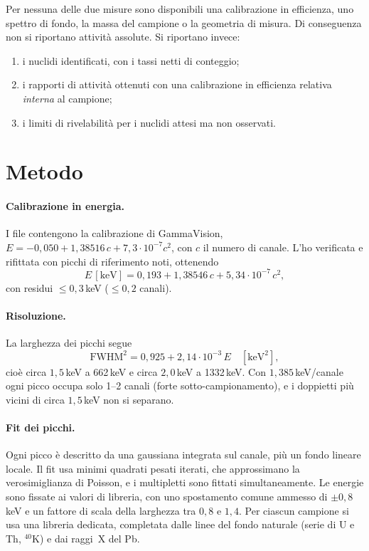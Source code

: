 \documentclass[11pt,a4paper]{article}
\newcommand{\nuc}[2]{\ensuremath{{}^{#1}\mathrm{#2}}}
\newcommand{\ee}[1]{\cdot 10^{#1}}
\begin{document}
Per nessuna delle due misure sono disponibili una calibrazione in efficienza, uno spettro di fondo, la massa del campione o la geometria di misura. Di conseguenza non si riportano attività assolute. Si riportano invece:
\begin{enumerate}[label=(\roman*)]
\item i nuclidi identificati, con i tassi netti di conteggio;
\item i rapporti di attività ottenuti con una calibrazione in efficienza relativa \emph{interna} al campione;
\item i limiti di rivelabilità per i nuclidi attesi ma non osservati.
\end{enumerate}

\section{Metodo}

\paragraph{Calibrazione in energia.}
I file contengono la calibrazione di GammaVision, $E=-0{,}050+1{,}38516\,c+7{,}3\ee{-7}c^2$, con $c$ il numero di canale. L'ho verificata e rifittata con picchi di riferimento noti, ottenendo
\[
E\,[\mathrm{keV}] = 0{,}193 + 1{,}38546\,c + 5{,}34\ee{-7}\,c^2,
\]
con residui $\le0{,}3$\,keV ($\le0{,}2$ canali).

\paragraph{Risoluzione.}
La larghezza dei picchi segue
\[
\mathrm{FWHM}^2 = 0{,}925 + 2{,}14\ee{-3}\,E \quad [\mathrm{keV}^2],
\]
cioè circa $1{,}5$\,keV a 662\,keV e circa $2{,}0$\,keV a 1332\,keV. Con $1{,}385$\,keV/canale ogni picco occupa solo 1--2 canali (forte sotto-campionamento), e i doppietti più vicini di circa $1{,}5$\,keV non si separano.

\paragraph{Fit dei picchi.}
Ogni picco è descritto da una gaussiana integrata sul canale, più un fondo lineare locale. Il fit usa minimi quadrati pesati iterati, che approssimano la verosimiglianza di Poisson, e i multipletti sono fittati simultaneamente. Le energie sono fissate ai valori di libreria, con uno spostamento comune ammesso di $\pm0{,}8$\,keV e un fattore di scala della larghezza tra $0{,}8$ e $1{,}4$. Per ciascun campione si usa una libreria dedicata, completata dalle linee del fondo naturale (serie di U e Th, \nuc{40}{K}) e dai raggi~X del Pb.
\end{document}
